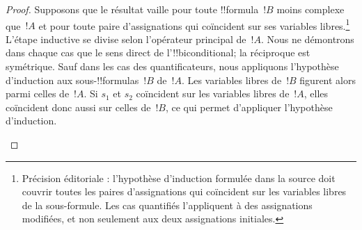 \documentclass[../../../include/open-logic-section]{subfiles}
\begin{document}
\begin{proof}
Supposons que le résultat vaille pour toute !!{formula}~$!B$ moins
complexe que~$!A$ et pour toute paire d'assignations qui coïncident
sur ses variables libres.\footnote{Précision éditoriale : l'hypothèse d'induction formulée dans la source doit couvrir toutes les paires d'assignations qui coïncident sur les variables libres de la sous-formule. Les cas quantifiés l'appliquent à des assignations modifiées, et non seulement aux deux assignations initiales.} L'étape inductive se divise selon l'opérateur principal
de~$!A$. Nous ne démontrons dans chaque cas que le sens direct de
l'!!{biconditional}; la réciproque est symétrique. Sauf dans les cas
des quantificateurs, nous appliquons l'hypothèse d'induction aux
sous-!!{formula}s~$!B$ de~$!A$. Les variables libres de~$!B$
figurent alors parmi celles de~$!A$. Si $s_1$ et $s_2$ coïncident
sur les variables libres de~$!A$, elles coïncident donc aussi sur
celles de~$!B$, ce qui permet d'appliquer l'hypothèse d'induction.

\begin{enumerate}






\end{enumerate}
\end{proof}
\end{document}
